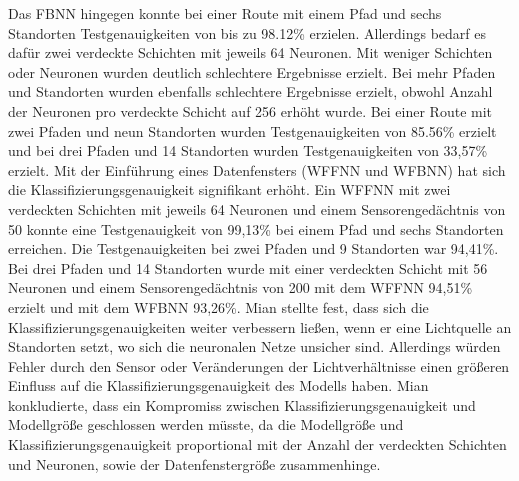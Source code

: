 \newline
Das FBNN hingegen konnte bei einer Route mit einem Pfad und sechs Standorten Testgenauigkeiten von bis zu 98.12\% erzielen.
Allerdings bedarf es dafür zwei verdeckte Schichten mit jeweils 64 Neuronen.
Mit weniger Schichten oder Neuronen wurden deutlich schlechtere Ergebnisse erzielt.
Bei mehr Pfaden und Standorten wurden ebenfalls schlechtere Ergebnisse erzielt, obwohl Anzahl der Neuronen pro verdeckte Schicht auf 256 erhöht wurde.
Bei einer Route mit zwei Pfaden und neun Standorten wurden Testgenauigkeiten von 85.56\% erzielt und
bei drei Pfaden und 14 Standorten wurden Testgenauigkeiten von 33,57\% erzielt.
\newline
\newline
Mit der Einführung eines Datenfensters (WFFNN und WFBNN) hat sich die Klassifizierungsgenauigkeit signifikant erhöht.
Ein WFFNN mit zwei verdeckten Schichten mit jeweils 64 Neuronen und einem Sensorengedächtnis von 50 konnte eine Testgenauigkeit von 99,13\%
bei einem Pfad und sechs Standorten erreichen.
Die Testgenauigkeiten bei zwei Pfaden und 9 Standorten war 94,41\%.
Bei drei Pfaden und 14 Standorten wurde mit einer verdeckten Schicht mit 56 Neuronen und einem Sensorengedächtnis von 200 mit dem WFFNN 94,51\% erzielt
und mit dem WFBNN 93,26\%.
\newline
\newline
Mian stellte fest, dass sich die Klassifizierungsgenauigkeiten weiter verbessern ließen,
wenn er eine Lichtquelle an Standorten setzt, wo sich die neuronalen Netze unsicher sind.
Allerdings würden Fehler durch den Sensor oder Veränderungen der Lichtverhältnisse
einen größeren Einfluss auf die Klassifizierungsgenauigkeit des Modells haben.
\newline
\newline
Mian konkludierte, dass ein Kompromiss zwischen Klassifizierungsgenauigkeit und Modellgröße geschlossen werden müsste,
da die Modellgröße und Klassifizierungsgenauigkeit proportional mit der Anzahl der verdeckten Schichten und Neuronen,
sowie der Datenfenstergröße zusammenhinge.
